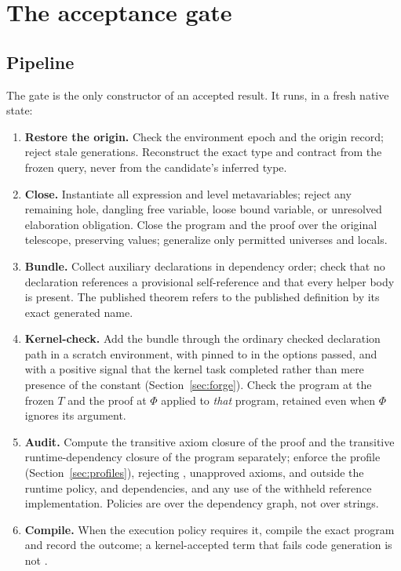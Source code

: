 \section{The acceptance gate}\label{sec:acceptance}

\subsection{Pipeline}

The gate is the only constructor of an accepted result. It runs, in a fresh native state:
\begin{enumerate}
\item \textbf{Restore the origin.} Check the environment epoch and the origin record; reject stale generations. Reconstruct the exact type and contract from the frozen query, never from the candidate's inferred type.
\item \textbf{Close.} Instantiate all expression and level metavariables; reject any remaining hole, dangling free variable, loose bound variable, or unresolved elaboration obligation. Close the program and the proof over the original telescope, preserving  values; generalize only permitted universes and locals.
\item \textbf{Bundle.} Collect auxiliary declarations in dependency order; check that no declaration references a provisional self-reference and that every helper body is present. The published theorem refers to the published definition by its exact generated name.
\item \textbf{Kernel-check.} Add the bundle through the ordinary checked declaration path in a scratch environment, with  pinned to  in the options passed, and with a positive signal that the kernel task completed rather than mere presence of the constant (Section~\ref{sec:forge}). Check the program at the frozen $T$ and the proof at $\Phi$ applied to \emph{that} program, retained even when $\Phi$ ignores its argument.
\item \textbf{Audit.} Compute the transitive axiom closure of the proof and the transitive runtime-dependency closure of the program separately; enforce the profile (Section~\ref{sec:profiles}), rejecting , unapproved axioms,  and  outside the runtime policy,  and  dependencies, and any use of the withheld reference implementation. Policies are over the dependency graph, not over strings.
\item \textbf{Compile.} When the execution policy requires it, compile the exact program and record the outcome; a kernel-accepted term that fails code generation is not .

\end{enumerate}
